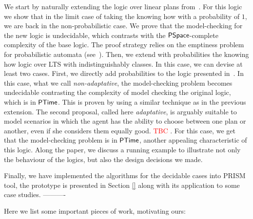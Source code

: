 We start by naturally extending the logic over linear plans from~\cite{Wang15lori,Wang16,Wang2016}.  For this logic we show that in the limit case of taking the knowing how with a probability of $1$, we are back in the non-probabilistic case. We prove that the model-checking for the new logic is undecidable,  which contrasts  with the ${\rm\textsf{PSpace}}$-complete complexity of the base logic. The proof strategy relies on the emptiness problem for probabilistic automata (see~\cite{MadaniHC99}). Then, we extend with probabilities the knowing how logic over LTS with indistinguishably classes. In this case, we can devise at least two cases.  First, we directly add probabilities to the logic presented in~\cite{AFSVQ21,AFSVQ23}. In this case, what we call \emph{non-adaptative}, the model-checking problem becomes undecidable  contrasting the complexity of model checking the original logic, which is in  ${\rm\textsf{PTime}}$. This is proven by using a similar technique as in the previous extension. The second proposal, called here \emph{adaptative}, is arguably suitable to model scenarios in which the agent has the ability to choose between one plan or another, even if she considers them equally good. \textcolor{red}{TBC} . For this case, we get that the model-checking problem is in ${\rm\textsf{PTime}}$, another appealing characteristic of this logic. Along the paper, we discuss a running example to illustrate not only the behaviour of the logics, but also the design decisions we made. 

Finally, we  have implemented the algorithms for the decidable cases into PRISM tool,  the prototype is presented in Section \ref{} along with its application to some case studies. 
\iffalse
---------- 

Here we list some important pieces of work, motivating ours:

